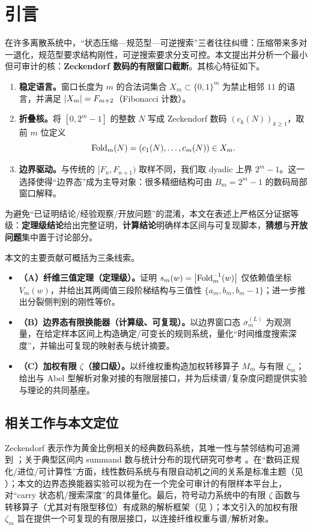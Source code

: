 
\section{引言}

在许多离散系统中，“状态压缩—规范型—可逆搜索”三者往往纠缠：压缩带来多对一退化，规范型要求结构刚性，可逆搜索要求分支可控。本文提出并分析一个最小但可审计的核：\textbf{Zeckendorf 数码的有限窗口截断}。其核心特征如下。

\begin{enumerate}
\item \textbf{稳定语言。}窗口长度为 $m$ 的合法词集合 $X_m\subset\{0,1\}^m$ 为禁止相邻 $11$ 的语言，并满足 $\left\lvert X_m\right\rvert=F_{m+2}$（Fibonacci 计数）。
\item \textbf{折叠核。}将 $[0,2^m-1]$ 的整数 $N$ 写成 Zeckendorf 数码 $(c_k(N))_{k\ge 1}$，取前 $m$ 位定义
$$
\mathrm{Fold}_m(N)=(c_1(N),\dots,c_m(N))\in X_m.
$$
\item \textbf{边界驱动。}与传统的 $[F_n,F_{n+1})$ 取样不同，我们取 dyadic 上界 $2^m-1$。这一选择使得“边界态”成为主导对象：很多精细结构可由 $B_m=2^m-1$ 的数码局部窗口解释。
\end{enumerate}

为避免“已证明结论/经验观察/开放问题”的混淆，本文在表述上严格区分证据等级：\textbf{定理级结论}给出完整证明，\textbf{计算结论}明确样本区间与可复现脚本，\textbf{猜想}与\textbf{开放问题}集中置于讨论部分。

本文的主要贡献可概括为三条线索。

\begin{itemize}
\item \textbf{（A）纤维三值定理（定理级）。}证明 $s_m(w)=\left\lvert \mathrm{Fold}_m^{-1}(w)\right\rvert$ 仅依赖值坐标 $V_m(w)$，并给出其两阈值三段阶梯结构与三值性 $\{a_m,b_m,b_m-1\}$；进一步推出分裂侧判别的刚性等价。
\item \textbf{（B）边界态有限换能器（计算级、可复现）。}以边界窗口态 $\sigma_m^{(L)}$ 为观测量，在给定样本区间上构造确定/可变长的规则系统，量化“时间维度搜索深度”，并输出可复现的映射表与统计摘要。
\item \textbf{（C）加权有限 $\zeta$（接口级）。}以纤维权重构造加权转移算子 $M_m$ 与有限 $\zeta_m$；给出与 Abel 型解析对象对接的有限层接口，并为后续谱/复杂度问题提供实验与理论的共同基座。
\end{itemize}

\subsection*{相关工作与本文定位}

Zeckendorf 表示作为黄金比例相关的经典数码系统，其唯一性与禁邻结构可追溯到 \cite{zeckendorf1972representation}；关于典型区间内 summand 数与统计分布的现代研究可参考 \cite{kologlu2011summands}。在“数码正规化/进位/可计算性”方面，线性数码系统与有限自动机之间的关系是标准主题（见 \cite{frougny1992representations,allouche2003automatic}）；本文的边界态换能器实验可以视为在一个完全可审计的有限样本平台上，对“carry 状态机/搜索深度”的具体量化。最后，符号动力系统中的有限 $\zeta$ 函数与转移算子（尤其对有限型移位）有成熟的解析框架（见 \cite{lind1995symbolic,bowenlanford1970zeta}）；本文引入的加权有限 $\zeta_m$ 旨在提供一个可复现的有限层接口，以连接纤维权重与谱/解析对象。

